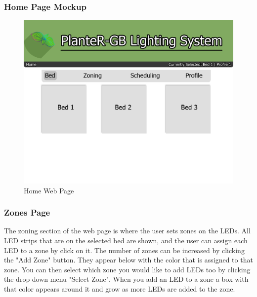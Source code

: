 \documentclass[onecolumn, draftclsnofoot,10pt, compsoc]{IEEEtran}
\begin{document}
			            \subsubsection{Home Page Mockup}
			            \begin{center}
			                \begin{figure}[H]
			                    \includegraphics[width=\linewidth]{web_design/BedPage.png}
			                    \caption{Home Web Page}
			                    \label{fig:Home Page}
			                \end{figure}
			            \end{center}
			            \subsubsection{Zones Page}
			            The zoning section of the web page is where the user sets zones on
			            the LEDs. All LED strips that are on the selected bed are shown, and the user can assign each LED to a zone by click on it.
									The number of zones can be increased by clicking the "Add Zone" button.
									They appear below with the color that is assigned to that zone. You can then select
			            which zone you would like to add LEDs too by clicking the drop down menu "Select Zone".
			            When you add an LED to a zone a box with that color appears around it
			            and grow as more LEDs are added to the zone.
\end{document}
